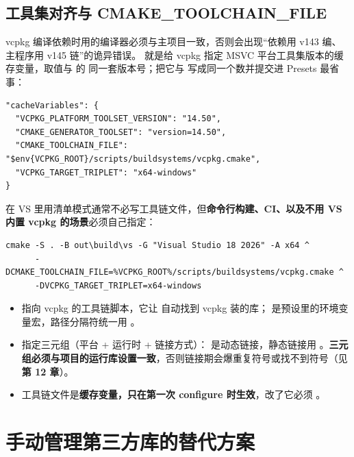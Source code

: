 \subsection{工具集对齐与 CMAKE\_TOOLCHAIN\_FILE}
vcpkg 编译依赖时用的编译器必须与主项目一致，否则会出现“依赖用 v143 编、主程序用 v145 链”的诡异错误。\textbf{} 就是给 vcpkg 指定 MSVC 平台工具集版本的缓存变量，取值与  的  同一套版本号；把它与  写成同一个数并提交进 Presets 最省事：

\begin{lstlisting}[style=jsonstyle]
"cacheVariables": {
  "VCPKG_PLATFORM_TOOLSET_VERSION": "14.50",
  "CMAKE_GENERATOR_TOOLSET": "version=14.50",
  "CMAKE_TOOLCHAIN_FILE": "$env{VCPKG_ROOT}/scripts/buildsystems/vcpkg.cmake",
  "VCPKG_TARGET_TRIPLET": "x64-windows"
}
\end{lstlisting}

在 VS 里用清单模式通常不必写工具链文件，但\textbf{命令行构建、CI、以及不用 VS 内置 vcpkg 的场景}必须自己指定：

\begin{lstlisting}[style=shellstyle]
cmake -S . -B out\build\vs -G "Visual Studio 18 2026" -A x64 ^
      -DCMAKE_TOOLCHAIN_FILE=%VCPKG_ROOT%/scripts/buildsystems/vcpkg.cmake ^
      -DVCPKG_TARGET_TRIPLET=x64-windows
\end{lstlisting}
\begin{itemize}
  \item \textbf{} 指向 vcpkg 的工具链脚本，它让  自动找到 vcpkg 装的库； 是预设里的环境变量宏，路径分隔符统一用 \code{/}。
  \item \textbf{} 指定三元组（平台 + 运行时 + 链接方式）： 是动态链接，静态链接用 。\textbf{三元组必须与项目的运行库设置一致}，否则链接期会爆重复符号或找不到符号（见\textbf{第 12 章}）。
  \item 工具链文件是\textbf{缓存变量，只在第一次 configure 时生效}，改了它必须 。
\end{itemize}
\section{手动管理第三方库的替代方案}
